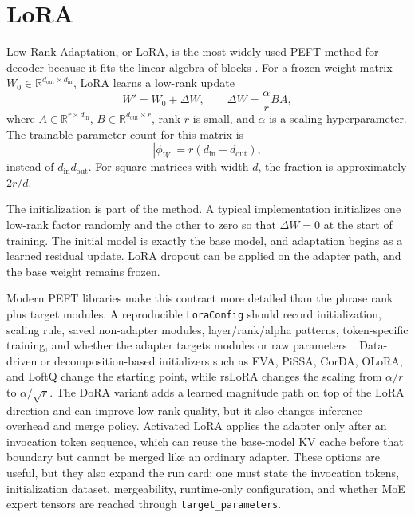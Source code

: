 \section{LoRA}
\label{sec:lora-mechanics}

Low-Rank Adaptation, or LoRA, is the most widely used PEFT method for decoder \llms because it fits the linear algebra of \transformer blocks \cite{hu2021lora}. For a frozen weight matrix $W_0\in\mathbb{R}^{d_{\mathrm{out}}\times d_{\mathrm{in}}}$, LoRA learns a low-rank update
\begin{equation}
  W' = W_0 + \Delta W,
  \qquad
  \Delta W = \frac{\alpha}{r} B A,
  \label{eq:lora-update}
\end{equation}
where $A\in\mathbb{R}^{r\times d_{\mathrm{in}}}$, $B\in\mathbb{R}^{d_{\mathrm{out}}\times r}$, rank $r$ is small, and $\alpha$ is a scaling hyperparameter. The trainable parameter count for this matrix is
\begin{equation}
  |\phi_W| = r(d_{\mathrm{in}} + d_{\mathrm{out}}),
  \label{eq:lora-param-count}
\end{equation}
instead of $d_{\mathrm{in}}d_{\mathrm{out}}$. For square matrices with width $d$, the fraction is approximately $2r/d$.

The initialization is part of the method. A typical implementation initializes one low-rank factor randomly and the other to zero so that $\Delta W=0$ at the start of training. The initial model is exactly the base model, and adaptation begins as a learned residual update. LoRA dropout can be applied on the adapter path, and the base weight remains frozen.

Modern PEFT libraries make this contract more detailed than the phrase rank plus target modules. A reproducible \texttt{LoraConfig} should record initialization, scaling rule, saved non-adapter modules, layer/rank/alpha patterns, token-specific training, and whether the adapter targets modules or raw parameters~\cite{huggingface2026peftlora}. Data-driven or decomposition-based initializers such as EVA, PiSSA, CorDA, OLoRA, and LoftQ change the starting point, while rsLoRA changes the scaling from $\alpha/r$ to $\alpha/\sqrt{r}$. The DoRA variant adds a learned magnitude path on top of the LoRA direction and can improve low-rank quality, but it also changes inference overhead and merge policy. Activated LoRA applies the adapter only after an invocation token sequence, which can reuse the base-model KV cache before that boundary but cannot be merged like an ordinary adapter. These options are useful, but they also expand the run card: one must state the invocation tokens, initialization dataset, mergeability, runtime-only configuration, and whether MoE expert tensors are reached through \texttt{target\_parameters}.

